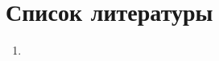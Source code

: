 \documentclass[../main/main.tex]{subfiles}
\begin{document}
    \newpage
    \section{Список литературы}
    \begin{enumerate}
        \item 
    \end{enumerate}
\end{document}
